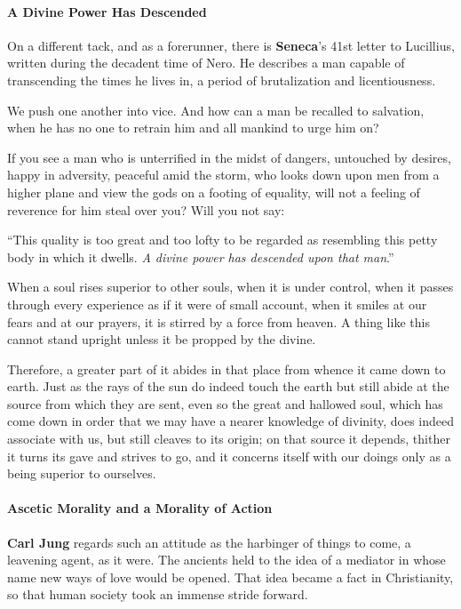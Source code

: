 \paragraph{A Divine Power Has Descended}


On a different tack, and as a forerunner, there is \textbf{Seneca}'s 41st letter to Lucillius, written during the decadent time of Nero. He describes a man capable of transcending the times he lives in, a period of brutalization and licentiousness.

\begin{quotationx}
We push one another into vice. And how can a man be recalled to salvation, when he has no one to retrain him and all mankind to urge him on?

If you see a man who is unterrified in the midst of dangers, untouched by desires, happy in adversity, peaceful amid the storm, who looks down upon men from a higher plane and view the gods on a footing of equality, will not a feeling of reverence for him steal over you? Will you not say:

``This quality is too great and too lofty to be regarded as resembling this petty body in which it dwells. \emph{A divine power has descended upon that man}.''

When a soul rises superior to other souls, when it is under control, when it passes through every experience as if it were of small account, when it smiles at our fears and at our prayers, it is stirred by a force from heaven. A thing like this cannot stand upright unless it be propped by the divine.

Therefore, a greater part of it abides in that place from whence it came down to earth. Just as the rays of the sun do indeed touch the earth but still abide at the source from which they are sent, even so the great and hallowed soul, which has come down in order that we may have a nearer knowledge of divinity, does indeed associate with us, but still cleaves to its origin; on that source it depends, thither it turns its gave and strives to go, and it concerns itself with our doings only as a being superior to ourselves.
\end{quotationx}


\paragraph{Ascetic Morality and a Morality of Action}


\textbf{Carl Jung} regards such an attitude as the harbinger of things to come, a leavening agent, as it were. The ancients held to the idea of a mediator in whose name new ways of love would be opened. That idea became a fact in Christianity, so that human society took an immense stride forward.

